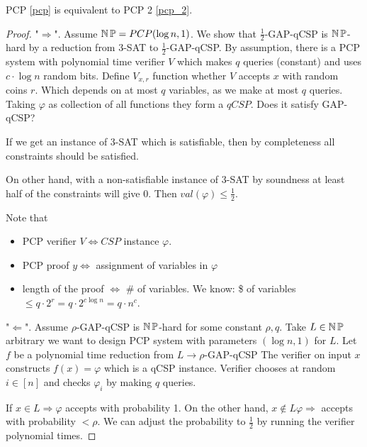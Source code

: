 \begin{theorem}
	PCP \cref{pcp} is equivalent to PCP 2 \cref{pcp_2}.
\end{theorem}
\begin{proof}
	"$\Rightarrow$". Assume $ \operatorname{\operatorname{\mathbb{N}}\mathbb{P}} = PCP (\log n, 1)$.
	We show that $\frac{1}{2}$-GAP-qCSP is $\operatorname{\operatorname{\mathbb{N}}\mathbb{P}}$-hard by a reduction from 3-SAT to $\frac{1}{2}$-GAP-qCSP.
	By assumption, there is a PCP system with polynomial time verifier $V$ which makes $q$ queries (constant) and uses $c \cdot \log n$ random bits.
	Define $V_{x, r}$ function whether $V$ accepts $x$ with random coins $r$.
	Which depends on at most $q$ variables, as we make at most $q$ queries.
	Taking $\varphi$ as collection of all functions they form a $qCSP$.
	Does it satisfy GAP-qCSP?

	If we get an instance of 3-SAT which is satisfiable, then by completeness all constraints should be satisfied.

	On other hand, with a non-satisfiable instance of 3-SAT by soundness at least half of the constraints will give 0. Then $val(\varphi) \leq \frac{1}{2}$.

	Note that
	\begin{itemize}
		\item PCP verifier $V \iff CSP$ instance $\varphi$.
		\item PCP proof $y \iff$ assignment of variables in $\varphi$
		\item length of the proof $\iff$ \# of variables.
			We know: \$ of variables $\leq q \cdot 2^r = q \cdot 2^{c \log n} = q \cdot n^c$.
	\end{itemize}

	"$\Leftarrow$". Assume $ \rho$-GAP-qCSP is $\operatorname{\operatorname{\mathbb{N}}\mathbb{P}}$-hard for some constant $\rho, q$.
	Take $L \in \operatorname{\operatorname{\mathbb{N}}\mathbb{P}}$ arbitrary we want to design PCP system with parameters $(\log n, 1)$ for $L$.
	Let $f$ be a polynomial time reduction from $L \to \rho$-GAP-qCSP
	The verifier on input $x$ constructs $f(x) = \varphi$ which is a qCSP instance.
	Verifier chooses at random $i \in [n]$ and checks $\varphi_i$ by making $q$ queries.

	If $x \in L \Rightarrow \varphi$ accepts with probability 1.
	On the other hand, $x \notin L \varphi \Rightarrow$ accepts with probability $< \rho$.
	We can adjust the probability to $\frac{1}{2}$ by running the verifier polynomial times.
\end{proof}
